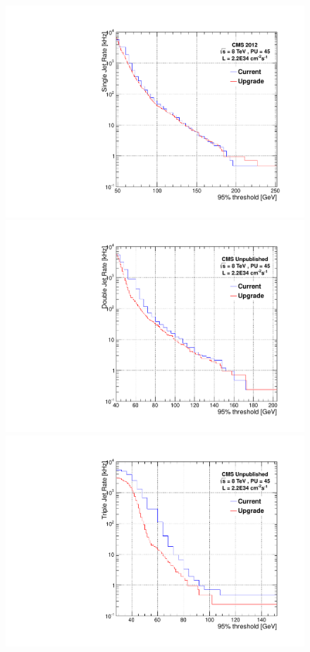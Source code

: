 \begin{figure}[t!]
\begin{center}
  \includegraphics[scale=0.3]{Figures/l1jets/singleJetRates_95thresh_2e34.pdf}
  \includegraphics[scale=0.3]{Figures/l1jets/doubleJetRates_95thresh_2e34.pdf}
  \includegraphics[scale=0.3]{Figures/l1jets/tripleJetRates_95thresh_2e34.pdf}

\end{center}
\end{figure}
